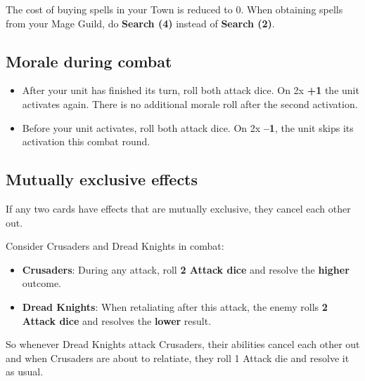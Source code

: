 \begin{multicols*}{2}
 The cost of buying spells in your Town is reduced to 0. When obtaining spells from your Mage Guild, 
do \textbf{Search (4)} instead of \textbf{Search (2)}.

\subsection*{Morale during combat}

\begin{itemize}
    \item {} After your unit has finished its turn, roll both attack dice. On 2x \textbf{+1} the unit activates again.
    There is no additional morale roll after the second activation.
    \item {} Before your unit activates, roll both attack dice. On 2x \textbf{--1}, the unit skips its activation this combat round.
\end{itemize}

\subsection*{Mutually exclusive effects}

If any two cards have effects that are mutually exclusive, they cancel each other out.

Consider Crusaders and Dread Knights in combat:

\begin{itemize}
    \item \textbf{Crusaders}:  During any attack, roll \textbf{2 Attack dice} and resolve the \textbf{higher} outcome.
    \item \textbf{Dread Knights}:  When retaliating after this attack, the enemy rolls \textbf{2 Attack dice} and resolves the \textbf{lower} result.
\end{itemize}

So whenever Dread Knights attack Crusaders, their abilities cancel each other out and when Crusaders are about to relatiate, 
they roll 1 Attack die and resolve it as usual.

\vfill

\end{multicols*}
